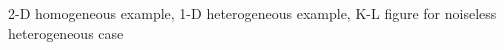 \documentclass[12pt]{article}
\newcommand{\1}{\mathbf{1}}
\theoremstyle{plain}
\theoremstyle{definition}
\theoremstyle{remark}
\theoremstyle{plain}
\theoremstyle{remark}
\theoremstyle{plain}
\theoremstyle{plain}
\begin{document}
2-D homogeneous example, 1-D heterogeneous example, K-L figure for noiseless heterogeneous case


%
%
%
%
\end{document}
